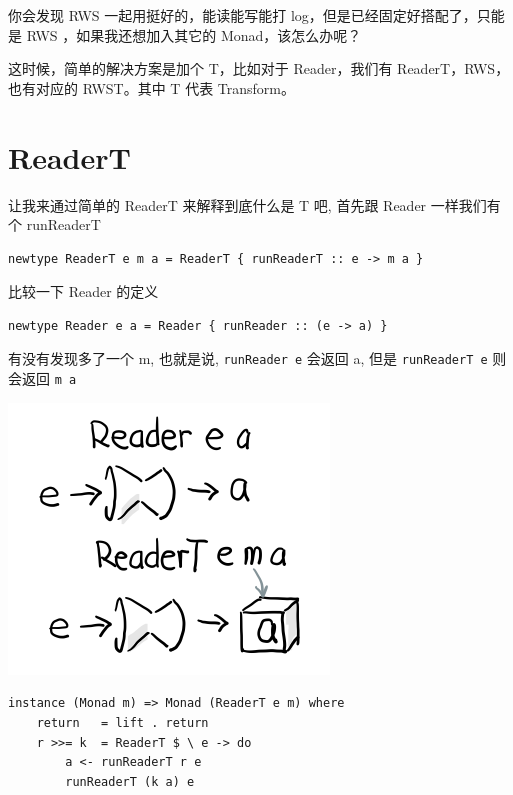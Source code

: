 \documentclass[11pt]{tufte-book}
\begin{document}
你会发现 RWS 一起用挺好的，能读能写能打 log，但是已经固定好搭配了，只能是 RWS ，如果我还想加入其它的 Monad，该怎么办呢？

这时候，简单的解决方案是加个 T，比如对于 Reader，我们有 ReaderT，RWS，也有对应的 RWST。其中 T 代表 Transform。

\section{ReaderT}
\label{sec:org69b65ad}

让我来通过简单的 ReaderT 来解释到底什么是 T 吧, 首先跟 Reader 一样我们有个 runReaderT

\begin{verbatim}
newtype ReaderT e m a = ReaderT { runReaderT :: e -> m a }
\end{verbatim}

比较一下 Reader 的定义
\begin{verbatim}
newtype Reader e a = Reader { runReader :: (e -> a) }
\end{verbatim}

有没有发现多了一个 m, 也就是说, \texttt{runReader e} 会返回 a, 但是 \texttt{runReaderT e} 则会返回 \texttt{m a}

\begin{center}
\includegraphics[width=.9\linewidth]{images/p3-ReaderT.png}
\end{center}

\begin{verbatim}
instance (Monad m) => Monad (ReaderT e m) where
    return   = lift . return
    r >>= k  = ReaderT $ \ e -> do
        a <- runReaderT r e
        runReaderT (k a) e
\end{verbatim}
\end{document}
